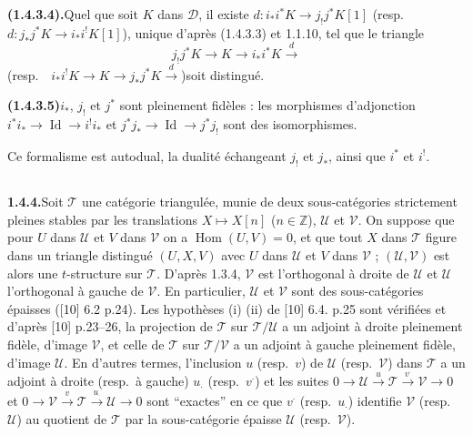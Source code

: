 \documentclass[12pt,a4paper]{article}
\theoremstyle{plain}
\theoremstyle{definition}
\DeclareMathOperator{\Hom}{Hom}
\DeclareMathOperator{\Id}{Id}
\begin{document}
\pagestyle{myheadings}

\noindent\textbf{(1.4.3.4).}\quad Quel que soit $K$ dans $\mathcal{D}$, il existe $d : i_*i^*K \to j_!j^*K[1]$ (resp.\ $d : j_*j^*K \to i_*i^!K[1]$), unique d'apr\`es (1.4.3.3) et 1.1.10, tel que le triangle
\[
j_!j^*K \to K \to i_*i^*K \xrightarrow{d}
\]
(resp.\ \ $i_*i^!K \to K \to j_*j^*K \xrightarrow{d}$)\quad soit distingu\'e.

\smallskip
\noindent\textbf{(1.4.3.5)}\quad $i_*$, $j_!$ et $j^*$ sont pleinement fid\`eles : les morphismes d'adjonction $i^*i_* \to \Id \to i^!i_*$ et $j^*j_* \to \Id \to j^*j_!$ sont des isomorphismes.

Ce formalisme est autodual, la dualit\'e \'echangeant $j_!$ et $j_*$, ainsi que $i^*$ et $i^!$.

\subsection{}
\noindent\textbf{1.4.4.}\quad Soit $\mathcal{T}$ une cat\'egorie triangul\'ee, munie de deux sous-cat\'egories strictement pleines stables par les translations $X \mapsto X[n]$ ($n \in \mathbb{Z}$), $\mathcal{U}$ et $\mathcal{V}$. On suppose que pour $U$ dans $\mathcal{U}$ et $V$ dans $\mathcal{V}$ on a $\Hom(U,V) = 0$, et que tout $X$ dans $\mathcal{T}$ figure dans un triangle distingu\'e $(U,X,V)$ avec $U$ dans $\mathcal{U}$ et $V$ dans $\mathcal{V}$ ; $(\mathcal{U},\mathcal{V})$ est alors une $t$-structure sur $\mathcal{T}$. D'apr\`es 1.3.4, $\mathcal{V}$ est l'orthogonal \`a droite de $\mathcal{U}$ et $\mathcal{U}$ l'orthogonal \`a gauche de $\mathcal{V}$. En particulier, $\mathcal{U}$ et $\mathcal{V}$ sont des sous-cat\'egories \'epaisses ([10] 6.2 p.24). Les hypoth\`eses (i) (ii) de [10] 6.4. p.25 sont v\'erifi\'ees et d'apr\`es [10] p.23--26, la projection de $\mathcal{T}$ sur $\mathcal{T}/\mathcal{U}$ a un adjoint \`a droite pleinement fid\`ele, d'image $\mathcal{V}$, et celle de $\mathcal{T}$ sur $\mathcal{T}/\mathcal{V}$ a un adjoint \`a gauche pleinement fid\`ele, d'image $\mathcal{U}$. En d'autres termes, l'inclusion $u$ (resp.\ $v$) de $\mathcal{U}$ (resp.\ $\mathcal{V}$) dans $\mathcal{T}$ a un adjoint \`a droite (resp.\ \`a gauche) $u_\cdot$ (resp.\ $v^\cdot$) et les suites $0 \longrightarrow \mathcal{U} \xrightarrow{u} \mathcal{T} \xrightarrow{v^\cdot} \mathcal{V} \longrightarrow 0$ et $0 \longrightarrow \mathcal{V} \xrightarrow{v} \mathcal{T} \xrightarrow{u_\cdot} \mathcal{U} \longrightarrow 0$ sont ``exactes'' en ce que $v^\cdot$ (resp.\ $u_\cdot$) identifie $\mathcal{V}$ (resp.\ $\mathcal{U}$) au quotient de $\mathcal{T}$ par la sous-cat\'egorie \'epaisse $\mathcal{U}$ (resp.\ $\mathcal{V}$).
\end{document}
